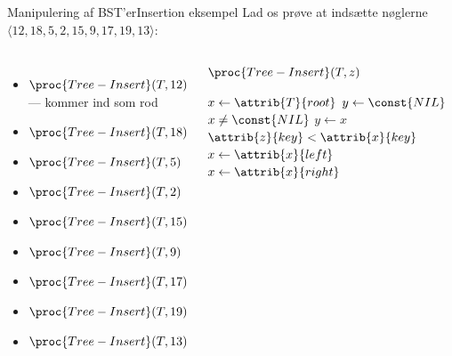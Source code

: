 \documentclass[aspectratio=1610]{beamer}
\begin{document}
\begin{frame}{Manipulering af BST'er}{Insertion eksempel}
    Lad os prøve at indsætte nøglerne $\langle 12,18,5,2,15,9,17,19,13 \rangle$:

    \begin{columns}
        \small
        \begin{itemize}[<+(1)->]
            \item $\proc{Tree-Insert}(T,12)$ --- kommer ind som rod
            \item $\proc{Tree-Insert}(T,18)$
            \item $\proc{Tree-Insert}(T,5)$
            \item $\proc{Tree-Insert}(T,2)$
            \item $\proc{Tree-Insert}(T,15)$
            \item $\proc{Tree-Insert}(T,9)$
            \item $\proc{Tree-Insert}(T,17)$
            \item $\proc{Tree-Insert}(T,19)$
            \item $\proc{Tree-Insert}(T,13)$
        \end{itemize}
    
        \centering

        \begin{block}{$\proc{Tree-Insert}(T,z)$}
            \small
        
            \vspace{-\abovedisplayskip}
            \begin{codebox}
                \li $x \gets \attrib{T}{root}$ 
                \li $y \gets \const{NIL}$ 
                \li \While $x \neq \const{NIL}$  
                    \Do
                \li     $y \gets x$ 
                \li     \If  $\attrib{z}{key} < \attrib{x}{key}$ 
                        \Then
                \li         $x \gets \attrib{x}{left}$
                \li     \Else $x \gets \attrib{x}{right}$
                        \End
                    \End


\end{codebox}
\end{block}
\end{columns}
\end{frame}
\end{document}
